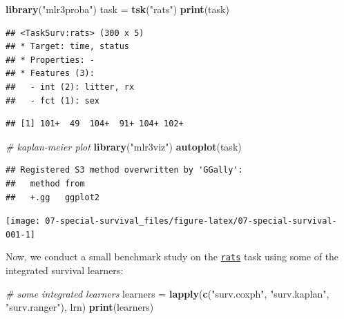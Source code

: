 \documentclass[]{scrbook}
\newenvironment{Shaded}{\begin{snugshade}}{\end{snugshade}}
\newcommand{\CommentTok}[1]{\textcolor[rgb]{0.56,0.35,0.01}{\textit{#1}}}
\newcommand{\KeywordTok}[1]{\textcolor[rgb]{0.13,0.29,0.53}{\textbf{#1}}}
\newcommand{\NormalTok}[1]{#1}
\newcommand{\OperatorTok}[1]{\textcolor[rgb]{0.81,0.36,0.00}{\textbf{#1}}}
\newcommand{\StringTok}[1]{\textcolor[rgb]{0.31,0.60,0.02}{#1}}
\renewenvironment{Shaded} {\begin{snugshade}\small} {\end{snugshade}}
\begin{document}
\begin{Shaded}
\begin{Highlighting}[]
\KeywordTok{library}\NormalTok{(}\StringTok{"mlr3proba"}\NormalTok{)}
\NormalTok{task =}\StringTok{ }\KeywordTok{tsk}\NormalTok{(}\StringTok{"rats"}\NormalTok{)}
\KeywordTok{print}\NormalTok{(task)}
\end{Highlighting}
\end{Shaded}

\begin{verbatim}
## <TaskSurv:rats> (300 x 5)
## * Target: time, status
## * Properties: -
## * Features (3):
##   - int (2): litter, rx
##   - fct (1): sex
\end{verbatim}

\begin{Shaded}
\end{Shaded}

\begin{verbatim}
## [1] 101+  49  104+  91+ 104+ 102+
\end{verbatim}

\begin{Shaded}
\begin{Highlighting}[]
\CommentTok{# kaplan-meier plot}
\KeywordTok{library}\NormalTok{(}\StringTok{"mlr3viz"}\NormalTok{)}
\KeywordTok{autoplot}\NormalTok{(task)}
\end{Highlighting}
\end{Shaded}

\begin{verbatim}
## Registered S3 method overwritten by 'GGally':
##   method from   
##   +.gg   ggplot2
\end{verbatim}

\begin{center}\texttt{[image: 07-special-survival\_files/figure-latex/07-special-survival-001-1]} \end{center}

Now, we conduct a small benchmark study on the \href{https://mlr3proba.mlr-org.com/reference/mlr_tasks_rats.html}{\texttt{rats}} task using some of the integrated survival learners:

\begin{Shaded}
\begin{Highlighting}[]
\CommentTok{# some integrated learners}
\NormalTok{learners =}\StringTok{ }\KeywordTok{lapply}\NormalTok{(}\KeywordTok{c}\NormalTok{(}\StringTok{"surv.coxph"}\NormalTok{, }\StringTok{"surv.kaplan"}\NormalTok{, }\StringTok{"surv.ranger"}\NormalTok{), lrn)}
\KeywordTok{print}\NormalTok{(learners)}
\end{Highlighting}
\end{Shaded}
\end{document}
